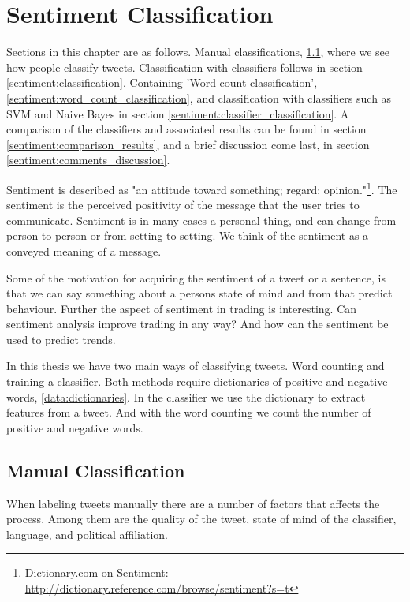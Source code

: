 \chapter{Sentiment Classification}\label{sentiment}

Sections in this chapter are as follows. Manual classifications,
\ref{sentiment:manual_classification}, where we see how people classify
tweets. Classification with classifiers follows in section
\ref{sentiment:classification}. Containing 'Word count classification',
\ref{sentiment:word_count_classification}, and classification with classifiers
such as SVM and Naive Bayes in section
\ref{sentiment:classifier_classification}. A comparison of the classifiers and
associated results can be found in section \ref{sentiment:comparison_results}, and a brief discussion come last, in section
\ref{sentiment:comments_discussion}. 

Sentiment is described as "an attitude toward something; regard;
opinion."\footnote{ Dictionary.com on Sentiment:
\url{http://dictionary.reference.com/browse/sentiment?s=t}}. The sentiment is the perceived positivity of the message that the user tries to
communicate. Sentiment is in many cases a personal thing, and can change from
person to person or from setting to setting. We think of the sentiment as a
conveyed meaning of a message. 

Some of the motivation for acquiring the sentiment of a tweet or a sentence, is
that we can say something about a persons state of mind and from that predict
behaviour. Further the aspect of sentiment in trading is interesting. Can
sentiment analysis improve trading in any way? And how can the sentiment be used
to predict trends.

In this thesis we have two main ways of classifying tweets. Word counting and
training a classifier. Both methods require dictionaries of positive and
negative words, \ref{data:dictionaries}. In the classifier we use the dictionary
to extract features from a tweet. And with the word counting we count the
number of positive and negative words. 

\section{Manual Classification}\label{sentiment:manual_classification}
When labeling tweets manually there are a number of factors that affects the
process. Among them are the quality of the tweet, state of mind of the
classifier, language, and political affiliation.


